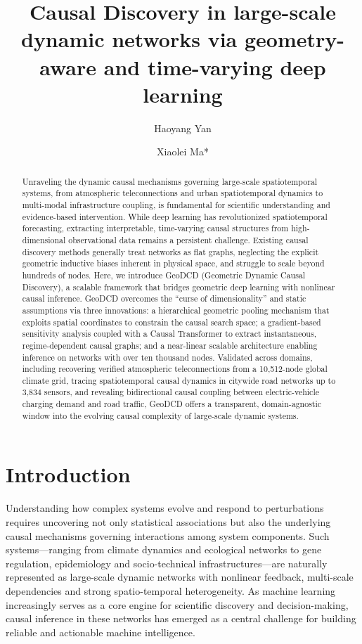 \documentclass{article}
\title{Causal Discovery in large-scale dynamic networks via geometry-aware and time-varying deep learning}
\author[1]{Haoyang Yan}
\author[1,2]{Xiaolei Ma*}
\affil[1]{School of Transportation Science and Engineering, Beihang University, Beijing, China.}
\affil[2]{Key Laboratory of Intelligent Transportation Technology and System of the Ministry of Education, Beihang University, Beijing 102206, China}
\affil[*]{Address correspondence to: xiaolei@buaa.edu.cn}
\date{}
\begin{document}
\maketitle

\begin{abstract}
Unraveling the dynamic causal mechanisms governing large-scale spatiotemporal systems, from atmospheric teleconnections and urban spatiotemporal dynamics to multi-modal infrastructure coupling, is fundamental for scientific understanding and evidence-based intervention. While deep learning has revolutionized spatiotemporal forecasting, extracting interpretable, time-varying causal structures from high-dimensional observational data remains a persistent challenge. Existing causal discovery methods generally treat networks as flat graphs, neglecting the explicit geometric inductive biases inherent in physical space, and struggle to scale beyond hundreds of nodes. Here, we introduce GeoDCD (Geometric Dynamic Causal Discovery), a scalable framework that bridges geometric deep learning with nonlinear causal inference. GeoDCD overcomes the ``curse of dimensionality'' and static assumptions via three innovations: a hierarchical geometric pooling mechanism that exploits spatial coordinates to constrain the causal search space; a gradient-based sensitivity analysis coupled with a Causal Transformer to extract instantaneous, regime-dependent causal graphs; and a near-linear scalable architecture enabling inference on networks with over ten thousand nodes. Validated across domains, including recovering verified atmospheric teleconnections from a 10,512-node global climate grid, tracing spatiotemporal causal dynamics in citywide road networks up to 3,834 sensors, and revealing bidirectional causal coupling between electric-vehicle charging demand and road traffic, GeoDCD offers a transparent, domain-agnostic window into the evolving causal complexity of large-scale dynamic systems.
\end{abstract}


\section{Introduction}
\label{sec:intro}

Understanding how complex systems evolve and respond to perturbations requires uncovering not only statistical associations but also the underlying causal mechanisms governing interactions among system components. Such systems—ranging from climate dynamics and ecological networks to gene regulation, epidemiology and socio-technical infrastructures—are naturally represented as large-scale dynamic networks with nonlinear feedback, multi-scale dependencies and strong spatio-temporal heterogeneity. As machine learning increasingly serves as a core engine for scientific discovery and decision-making, causal inference in these networks has emerged as a central challenge for building reliable and actionable machine intelligence.
\end{document}
